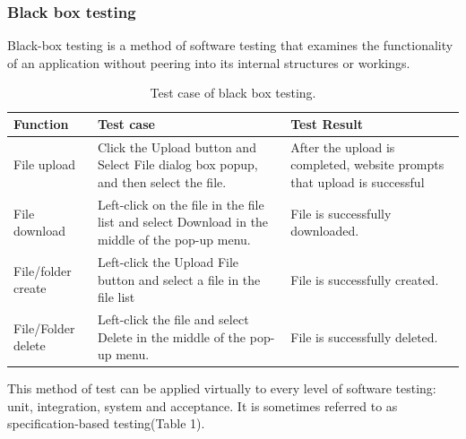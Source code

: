\documentclass[12pt,a4]{article}
\begin{document}
\subsubsection{Black box testing }\label{4.4.2}
Black-box testing is a method of software testing that examines the functionality of an application without peering into its internal structures or workings. 
\newcommand{\tabincell}[2]{\begin{tabular}{@{}#1@{}}#2\end{tabular}} 
\begin{table}[h]
\caption{Test case of black box testing.} 
\begin{tabular}{|p{100pt}|p{130pt}|p{130pt}|}
\hline
Function           & Test case                                                                                     & Test Result                                                              \\
\hline
File upload        & Click the Upload button and Select File dialog box popup, and then select the file.           & After the upload is completed, website prompts that upload is successful \\
\hline
File download      & Left-click on the file in the file list and select Download in the middle of the pop-up menu. & File is successfully downloaded.                                         \\
\hline
File/folder create & Left-click the Upload File button and select a file in the file list                          & File is successfully created.                                            \\
\hline
File/Folder delete & Left-click the file and select Delete in the middle of the pop-up menu.                       & File is successfully deleted. \\                                          
\hline
\end{tabular}
 
\end{table}
This method of test can be 
applied virtually to every level of software testing: unit, integration, system and acceptance. It is sometimes referred to as specification-based testing(Table 1).
\end{document}

